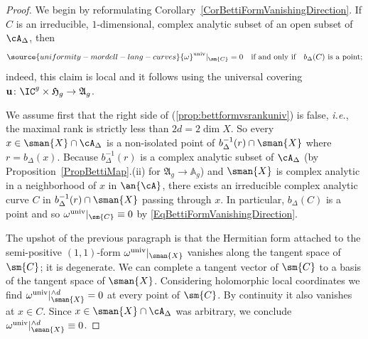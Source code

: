 \begin{proof}
We begin by  reformulating
Corollary~\ref{CorBettiFormVanishingDirection}.
If ${C}$ is an irreducible, $1$-dimensional, complex analytic subset
of an open subset of ${\cA_\Delta}$, then
\begin{equation}\label{EqBettiFormVanishingDirection}
\source{uniformity-mordell-lang-curves}
{\omega}^{\mathrm{univ}}|_{\sm{C}} = 0 \quad\text{if
and only if}\quad b_\Delta({C})\text{ is a point};
\end{equation}
indeed, this claim is local and it follows using the universal
covering
$\mathbf{u} \colon \IC^g\times\mathfrak{H}_g \rightarrow \mathfrak{A}_g$.

We assume first that the right side of (\ref{prop:bettformvsrankuniv})
is false, \textit{i.e.}, the maximal rank is strictly less than
$2d=2\dim X$.
So  every $x\in \sman{X}\cap\cA_\Delta$  is a non-isolated point of
$b_\Delta^{-1}(r) \cap \sman{X}$  where $r =
b_\Delta(x)$. Because
$b_\Delta^{-1}(r)$ is a complex analytic subset of $\cA_\Delta$ (by Proposition~\ref{PropBettiMap}.(ii) for $\mathfrak{A}_g \rightarrow \mathbb{A}_g$) and $\sman{X}$ is complex
analytic in a neighborhood of $x$ in $\an{\cA}$, there exists  an irreducible
complex analytic curve ${C}$ in  $b_\Delta^{-1}(r) \cap \sman{X}$ passing
through $x$. In
particular, $b_\Delta({C})$ is a point
and so ${\omega}^{\mathrm{univ}}|_{\sm{C}} \equiv 0$ by \eqref{EqBettiFormVanishingDirection}.

The upshot of the previous paragraph is that the Hermitian form
attached to the semi-positive $(1,1)$-form ${\omega}^{\mathrm{univ}}|_{\sman{X}}$
 vanishes along the tangent space of $\sm{C}$; it is degenerate.
We can complete a tangent vector of $\sm{C}$  to a basis of
the tangent space of $\sman{X}$. Considering holomorphic local
coordinates
we find ${\omega}^{\mathrm{univ}}|_{\sman{X}}^{\wedge d}=0$ at every
point of $\sm{C}$. By continuity it also vanishes at $x \in C$. Since
$x\in \sman{X}\cap\cA_\Delta$ was arbitrary, we conclude
${\omega}^{\mathrm{univ}}|_{\sman{X}}^{\wedge d}\equiv 0$.


\end{proof}

